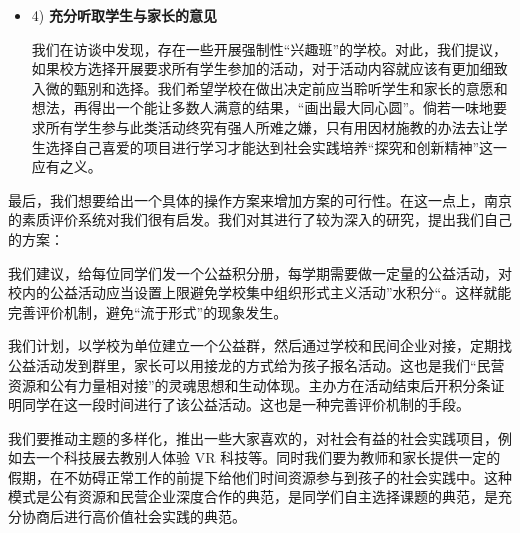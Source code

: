\documentclass[12pt,UTF8]{ctexart}
\begin{document}
{\begin {itemize}
{		我们从问卷和访谈中发现，不少同学家长无法进行社会实践，归根结底是客观时间因素阻碍。建议学校在做出全校的社会实践安排同时，同时做好相关学校政策的安排，为家长老师参与进社会实践活动提供便利，创造条件。家长所工作的企业也应当安排适当的休假，协助他们参加孩子的实践活动。指导老师董涛玲告诉我们，这点在学校已有体现：只要和工作安排不冲突的，学校每个月都为教师应当提供适量的假期，为家长参与社会实践活动提供便利，创造条件。
	}
	\item [4)] \textbf{充分听取学生与家长的意见}
	\par {
		
		我们在访谈中发现，存在一些开展强制性“兴趣班”的学校。对此，我们提议，如果校方选择开展要求所有学生参加的活动，对于活动内容就应该有更加细致入微的甄别和选择。我们希望学校在做出决定前应当聆听学生和家长的意愿和想法，再得出一个能让多数人满意的结果，“画出最大同心圆”。倘若一味地要求所有学生参与此类活动终究有强人所难之嫌，只有用因材施教的办法去让学生选择自己喜爱的项目进行学习才能达到社会实践培养“探究和创新精神”这一应有之义。
	}
	\end {itemize}
}
\par {
	最后，我们想要给出一个具体的操作方案来增加方案的可行性。在这一点上，南京的素质评价系统对我们很有启发。我们对其进行了较为深入的研究，提出我们自己的方案：
}
\par {
	
	我们建议，给每位同学们发一个公益积分册，每学期需要做一定量的公益活动，对校内的公益活动应当设置上限避免学校集中组织形式主义活动”水积分“。这样就能完善评价机制，避免“流于形式”的现象发生。
}
\par {
	
	我们计划，以学校为单位建立一个公益群，然后通过学校和民间企业对接，定期找公益活动发到群里，家长可以用接龙的方式给为孩子报名活动。这也是我们“民营资源和公有力量相对接”的灵魂思想和生动体现。主办方在活动结束后开积分条证明同学在这一段时间进行了该公益活动。这也是一种完善评价机制的手段。
}
\par {
	我们要推动主题的多样化，推出一些大家喜欢的，对社会有益的社会实践项目，例如去一个科技展去教别人体验 VR
	科技等。同时我们要为教师和家长提供一定的假期，在不妨碍正常工作的前提下给他们时间资源参与到孩子的社会实践中。这种模式是公有资源和民营企业深度合作的典范，是同学们自主选择课题的典范，是充分协商后进行高价值社会实践的典范。
}
\end{document}
